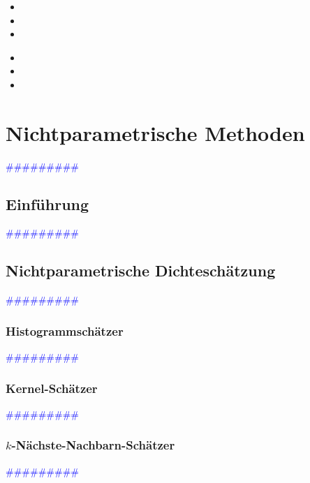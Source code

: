 \documentclass{article}
\begin{document}
      \begin{itemize}
      \color{red}
        \item 
        \item
        \item
      \end{itemize}


      \begin{itemize}
      \color{ForestGreen}
        \item 
        \item
        \item
      \end{itemize}



\newpage
\section{Nichtparametrische Methoden} %
       \textcolor{blue}{\#\#\#\#\#\#\#\#\#}
  \subsection{Einführung} %
       \textcolor{blue}{\#\#\#\#\#\#\#\#\#}
  \subsection{Nichtparametrische Dichteschätzung} %
       \textcolor{blue}{\#\#\#\#\#\#\#\#\#}
    \subsubsection{Histogrammschätzer} %
       \textcolor{blue}{\#\#\#\#\#\#\#\#\#}
    \subsubsection{Kernel-Schätzer} %
       \textcolor{blue}{\#\#\#\#\#\#\#\#\#}
    \subsubsection{$k$-Nächste-Nachbarn-Schätzer} %
       \textcolor{blue}{\#\#\#\#\#\#\#\#\#}
\end{document}
